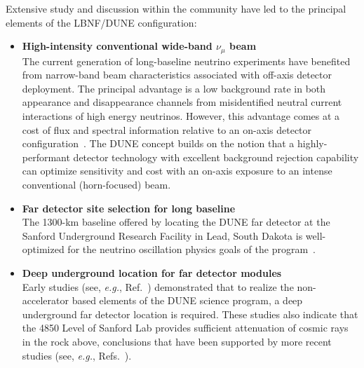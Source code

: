 Extensive study and discussion within the community
have led to the principal elements of the LBNF/DUNE
configuration:
\begin{itemize}
  \item {\bf\boldmath High-intensity conventional wide-band
  $\nu_\mu$ beam}\\
	The current generation of long-baseline neutrino experiments
	have benefited from narrow-band beam characteristics 
	associated with off-axis detector deployment. The principal 
	advantage is a low background rate in both \nue appearance 
	and \numu disappearance channels from misidentified neutral 
	current interactions of high energy neutrinos.  
	However, this advantage comes at a cost of flux and 
	spectral information relative to an on-axis detector 
    configuration~\cite{Adams:2013qkq,Agarwalla:2014tca}.
    The DUNE concept
    builds on the notion that a highly-performant detector
    technology with excellent background rejection capability can
    optimize sensitivity and cost with an on-axis exposure to
    an intense conventional (horn-focused) beam.

  \item {\bf Far detector site selection for long baseline}\\
    The 1300-km baseline offered by locating the DUNE far detector
    at the Sanford Underground Research Facility in Lead, 
    South Dakota is well-optimized for the neutrino oscillation 
    physics goals of the program~\cite{Bass:2013vcg}.

  \item {\bf Deep underground location for far detector modules}\\
    Early studies (see, {\sl e.g.}, Ref.~\cite{homestake:depth}) 
    demonstrated that to realize the non-accelerator based elements
    of the DUNE science program, a deep underground far detector
    location is required.  These studies also indicate that the 
    4850 Level of Sanford Lab provides sufficient attenuation of 
    cosmic rays in the rock above, conclusions that have been 
    supported by more recent studies (see,
    {\sl e.g.}, Refs.~\cite{bib:docdb3384,bib:docdb1752}).


\end{itemize}
